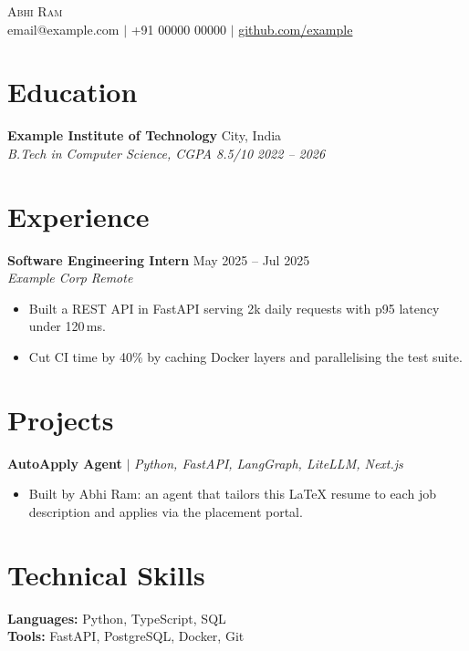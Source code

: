 \documentclass[letterpaper,10pt]{article}
\newcommand{\entry}[4]{%
  \textbf{#1} \hfill #2 \\
  \textit{\small #3} \hfill \textit{\small #4}
}
\newcommand{\project}[2]{\textbf{#1} $|$ \textit{\small #2}}
\newcommand{\resumeItem}[1]{\item\small{#1}}
\newenvironment{bullets}{\begin{itemize}[leftmargin=0.15in, itemsep=-1pt, topsep=1pt]}{\end{itemize}\vspace{-2pt}}
\begin{document}
\begin{center}
  {\Large\scshape Abhi Ram} \\ \vspace{2pt}
  \small email@example.com $|$ +91 00000 00000 $|$ \href{https://github.com/example}{github.com/example}
\end{center}

\section{Education}
\entry{Example Institute of Technology}{City, India}{B.Tech in Computer Science, CGPA 8.5/10}{2022 -- 2026}

\section{Experience}
\entry{Software Engineering Intern}{May 2025 -- Jul 2025}{Example Corp}{Remote}
\begin{bullets}
  \resumeItem{Built a REST API in FastAPI serving 2k daily requests with p95 latency under 120\,ms.}
  \resumeItem{Cut CI time by 40\% by caching Docker layers and parallelising the test suite.}
\end{bullets}

\section{Projects}
\project{AutoApply Agent}{Python, FastAPI, LangGraph, LiteLLM, Next.js}
\begin{bullets}
  \resumeItem{Built by Abhi Ram: an agent that tailors this LaTeX resume to each job description and applies via the placement portal.}
\end{bullets}

\section{Technical Skills}
\textbf{Languages:} Python, TypeScript, SQL \\
\textbf{Tools:} FastAPI, PostgreSQL, Docker, Git
\end{document}

